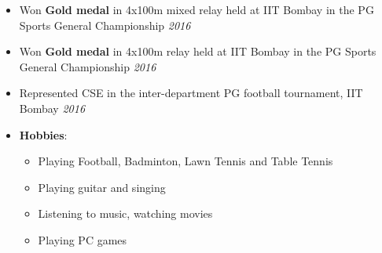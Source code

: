 \begin{itemize}
	\item Won \textbf{Gold medal} in 4x100m mixed relay held at IIT Bombay in the PG Sports General Championship \hfill \emph{2016} \\[-0.6cm]
	\item Won \textbf{Gold medal} in 4x100m relay held at IIT Bombay in the PG Sports General Championship \hfill \emph{2016} \\[-0.6cm]
	\item Represented CSE in the inter-department PG football tournament, IIT Bombay \hfill \emph{2016} \\[-0.6cm]
	\item \textbf{Hobbies}: \hfill \\[-0.6cm]
	\begin{itemize}
		\item Playing Football, Badminton, Lawn Tennis and Table Tennis \\[-0.5cm]
		\item Playing guitar and singing \\[-0.5cm]
		\item Listening to music, watching movies \\[-0.5cm]
		\item Playing PC games
	\end{itemize}
\end{itemize}
